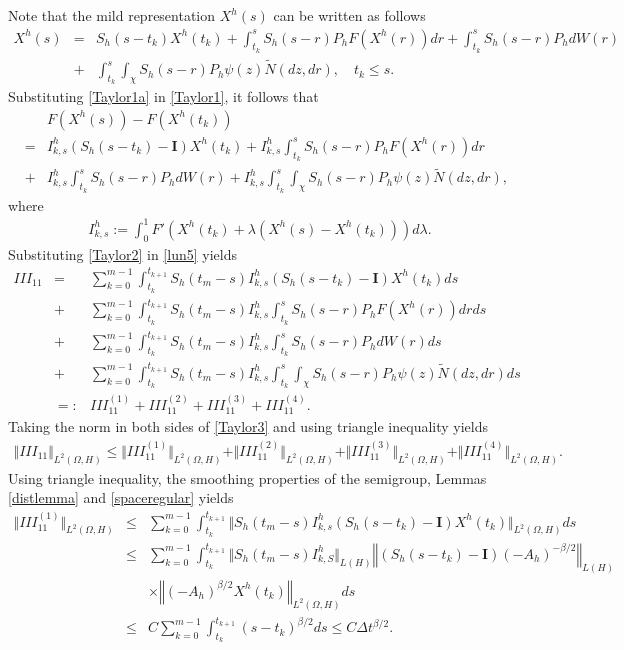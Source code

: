 \documentclass[review,12pt]{elsarticle}
\begin{document}
Note that the mild representation $X^h(s)$ can be written as follows
\begin{eqnarray}
\label{Taylor1a}
X^h(s)&=&S_h(s-t_k)X^h(t_k)+\int_{t_k}^sS_h(s-r)P_hF(X^h(r))dr+\int_{t_k}^sS_h(s-r)P_hdW(r)\nonumber\\
&+&\int_{t_k}^s\int_{\chi}S_h(s-r)P_h\psi(z)\widetilde{N}(dz,dr),\quad t_k\leq s.
\end{eqnarray}
Substituting \eqref{Taylor1a} in \eqref{Taylor1}, it follows that
\begin{eqnarray}
\label{Taylor2}
&&F(X^h(s))-F(X^h(t_k))\nonumber\\
&=&I^h_{k,s}\left(S_h(s-t_k)-\mathbf{I}\right)X^h(t_k)+I^h_{k,s}\int_{t_k}^sS_h(s-r)P_hF(X^h(r))dr\nonumber\\
&+&I^h_{k,s}\int_{t_k}^sS_h(s-r)P_hdW(r)+I^h_{k,s}\int_{t_k}^s\int_{\chi}S_h(s-r)P_h\psi(z)\widetilde{N}(dz,dr),
\end{eqnarray}
where
\begin{eqnarray}
\label{Taylor2a}
I^h_{k,s}:=\int_0^1F'\left(X^h(t_k)+\lambda\left(X^h(s)-X^h(t_k)\right)\right)d\lambda.
\end{eqnarray}
Substituting \eqref{Taylor2} in \eqref{lun5} yields
\begin{eqnarray}
\label{Taylor3}
III_{11}&=&\sum_{k=0}^{m-1}\int_{t_k}^{t_{k+1}}S_h(t_m-s)I^h_{k,s}\left(S_h(s-t_k)-\mathbf{I}\right)X^h(t_k)ds\nonumber\\
&+&\sum_{k=0}^{m-1}\int_{t_k}^{t_{k+1}}S_h(t_m-s)I^h_{k,s}\int_{t_k}^sS_h(s-r)P_hF(X^h(r))drds\nonumber\\
&+&\sum_{k=0}^{m-1}\int_{t_k}^{t_{k+1}}S_h(t_m-s)I^h_{k,s}\int_{t_k}^sS_h(s-r)P_hdW(r)ds\nonumber\\
&+&\sum_{k=0}^{m-1}\int_{t_k}^{t_{k+1}}S_h(t_m-s)I^h_{k,s}\int_{t_k}^s\int_{\chi}S_h(s-r)P_h\psi(z)\widetilde{N}(dz,dr)ds\nonumber\\
&=:&III_{11}^{(1)}+III_{11}^{(2)}+III_{11}^{(3)}+III_{11}^{(4)}.
\end{eqnarray}
Taking the norm in both sides of \eqref{Taylor3} and using triangle inequality yields
\begin{eqnarray}
\label{Taylor4}
\Vert III_{11}\Vert_{L^2(\Omega, H)}\leq \Vert III_{11}^{(1)}\Vert_{L^2(\Omega,H)}+\Vert III_{11}^{(2)}\Vert_{L^2(\Omega, H)}+\Vert III_{11}^{(3)}\Vert_{L^2(\Omega,H)}+\Vert III_{11}^{(4)}\Vert_{L^2(\Omega,H)}.
\end{eqnarray}
Using triangle inequality, the smoothing properties of the semigroup, Lemmas \ref{distlemma} and \ref{spaceregular} yields
\begin{eqnarray}
\label{Taylor5}
\Vert III_{11}^{(1)}\Vert_{L^2(\Omega,H)}&\leq& \sum_{k=0}^{m-1}\int_{t_k}^{t_{k+1}}\Vert S_h(t_m-s)I^h_{k,s}\left(S_h(s-t_k)-\mathbf{I}\right)X^h(t_k)\Vert_{L^2(\Omega, H)}ds\nonumber\\
&\leq& \sum_{k=0}^{m-1}\int_{t_k}^{t_{k+1}}\Vert S_h(t_m-s)I^h_{k,S}\Vert_{L(H)}\left\Vert\left(S_h(s-t_k)-\mathbf{I}\right)(-A_h)^{-\beta/2}\right\Vert_{L(H)}\nonumber\\
&&\times\left\Vert(-A_h)^{\beta/2}X^h(t_k)\right\Vert_{L^2(\Omega,H)}ds\nonumber\\
&\leq& C\sum_{k=0}^{m-1}\int_{t_k}^{t_{k+1}}(s-t_k)^{\beta/2}ds\leq C\Delta t^{\beta/2}.
\end{eqnarray}
\end{document}
